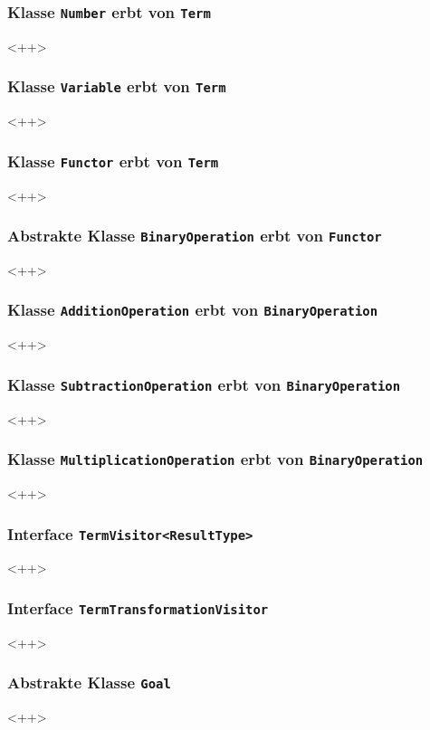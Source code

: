 \documentclass[parskip=full,11pt,twoside]{scrartcl}
\begin{document}
\subsubsection{Klasse \texttt{Number} erbt von \texttt{Term}}
<++>

\subsubsection{Klasse \texttt{Variable} erbt von \texttt{Term}}
<++>

\subsubsection{Klasse \texttt{Functor} erbt von \texttt{Term}}
<++>
\subsubsection{Abstrakte Klasse \texttt{BinaryOperation} erbt von \texttt{Functor}}
<++>

\subsubsection{Klasse \texttt{AdditionOperation} erbt von \texttt{BinaryOperation}}
<++>

\subsubsection{Klasse \texttt{SubtractionOperation} erbt von \texttt{BinaryOperation}}
<++>

\subsubsection{Klasse \texttt{MultiplicationOperation} erbt von \texttt{BinaryOperation}}
<++>
\subsubsection{Interface \texttt{TermVisitor<ResultType>}}
<++>

\subsubsection{Interface \texttt{TermTransformationVisitor}}
<++>
\subsubsection{Abstrakte Klasse \texttt{Goal}}
<++>
\end{document}
